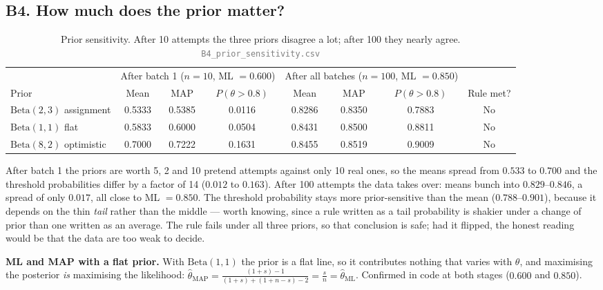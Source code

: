 \documentclass[12pt,a4paper]{article}
\newcommand{\file}[1]{\textcolor{gray}{\small\texttt{#1}}}
\begin{document}
\subsection{B4. How much does the prior matter?}

\begin{table}[H]\centering\small
\caption{Prior sensitivity. After 10 attempts the three priors disagree a lot; after 100 they nearly
agree. \file{B4\_prior\_sensitivity.csv}}
\label{tab:Bprior}
\begin{tabular}{lccccccc}
\toprule
& \multicolumn{3}{c}{After batch 1 ($n{=}10$, ML $=0.600$)} & \multicolumn{3}{c}{After all batches ($n{=}100$, ML $=0.850$)} & \\
\cmidrule(lr){2-4}\cmidrule(lr){5-7}
Prior & Mean & MAP & $P(\theta{>}0.8)$ & Mean & MAP & $P(\theta{>}0.8)$ & Rule met? \\
\midrule
$\mathrm{Beta}(2,3)$ assignment & 0.5333 & 0.5385 & 0.0116 & 0.8286 & 0.8350 & 0.7883 & No \\
$\mathrm{Beta}(1,1)$ flat       & 0.5833 & 0.6000 & 0.0504 & 0.8431 & 0.8500 & 0.8811 & No \\
$\mathrm{Beta}(8,2)$ optimistic & 0.7000 & 0.7222 & 0.1631 & 0.8455 & 0.8519 & 0.9009 & No \\
\bottomrule
\end{tabular}
\end{table}

After batch 1 the priors are worth 5, 2 and 10 pretend attempts against only 10 real ones, so the means
spread from $0.533$ to $0.700$ and the threshold probabilities differ by a factor of 14 ($0.012$ to
$0.163$). After 100 attempts the data takes over: means bunch into $0.829$--$0.846$, a spread of only
$0.017$, all close to ML $=0.850$. The threshold probability stays more prior-sensitive than the mean
($0.788$--$0.901$), because it depends on the thin \emph{tail} rather than the middle --- worth knowing,
since a rule written as a tail probability is shakier under a change of prior than one written as an
average. The rule fails under all three priors, so that conclusion is safe; had it flipped, the honest
reading would be that the data are too weak to decide.

\textbf{ML and MAP with a flat prior.} With $\mathrm{Beta}(1,1)$ the prior is a flat line, so it
contributes nothing that varies with $\theta$, and maximising the posterior \emph{is} maximising the
likelihood: $\hat\theta_{\mathrm{MAP}}=\frac{(1+s)-1}{(1+s)+(1+n-s)-2}=\frac{s}{n}=\hat\theta_{\mathrm{ML}}$.
Confirmed in code at both stages ($0.600$ and $0.850$).
\end{document}

